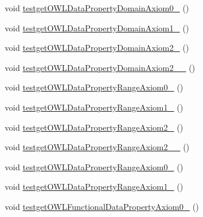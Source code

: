 \begin{DoxyCompactItemize}
\item 
void \hyperlink{classorg_1_1semanticweb_1_1owlapi_1_1api_1_1test_1_1_null_check_test_case_a35f9b613028e8d0bfddeb17ad31bd2d2}{testget\-O\-W\-L\-Data\-Property\-Domain\-Axiom0\-\_} ()
\item 
void \hyperlink{classorg_1_1semanticweb_1_1owlapi_1_1api_1_1test_1_1_null_check_test_case_ae4232028b1cac6cd1e59cfaa59e00edf}{testget\-O\-W\-L\-Data\-Property\-Domain\-Axiom1\-\_} ()
\item 
void \hyperlink{classorg_1_1semanticweb_1_1owlapi_1_1api_1_1test_1_1_null_check_test_case_aa768e12e483851c0548b05d6258f0262}{testget\-O\-W\-L\-Data\-Property\-Domain\-Axiom2\-\_} ()
\item 
void \hyperlink{classorg_1_1semanticweb_1_1owlapi_1_1api_1_1test_1_1_null_check_test_case_a3d2b5d087a7d6007fd44889649dc9647}{testget\-O\-W\-L\-Data\-Property\-Domain\-Axiom2\-\_\-\_} ()
\item 
void \hyperlink{classorg_1_1semanticweb_1_1owlapi_1_1api_1_1test_1_1_null_check_test_case_a3d0295a72e309258ad5590ffeb5872f0}{testget\-O\-W\-L\-Data\-Property\-Range\-Axiom0\-\_} ()
\item 
void \hyperlink{classorg_1_1semanticweb_1_1owlapi_1_1api_1_1test_1_1_null_check_test_case_a218759691599ef8ff486a4176f26eec4}{testget\-O\-W\-L\-Data\-Property\-Range\-Axiom1\-\_} ()
\item 
void \hyperlink{classorg_1_1semanticweb_1_1owlapi_1_1api_1_1test_1_1_null_check_test_case_a52a5991f75316ddeb27873025d0f3bf6}{testget\-O\-W\-L\-Data\-Property\-Range\-Axiom2\-\_} ()
\item 
void \hyperlink{classorg_1_1semanticweb_1_1owlapi_1_1api_1_1test_1_1_null_check_test_case_a65ff4352d263becf3473048848f5d43b}{testget\-O\-W\-L\-Data\-Property\-Range\-Axiom2\-\_\-\_} ()
\item 
void \hyperlink{classorg_1_1semanticweb_1_1owlapi_1_1api_1_1test_1_1_null_check_test_case_a2b4b97c47b650f3a342f45c47e4913b3}{testget\-O\-W\-L\-Data\-Property\-Range\-Axiom0\-\_} ()
\item 
void \hyperlink{classorg_1_1semanticweb_1_1owlapi_1_1api_1_1test_1_1_null_check_test_case_ad241f37825655aef67bb26edb9e66d99}{testget\-O\-W\-L\-Data\-Property\-Range\-Axiom1\-\_} ()
\item 
void \hyperlink{classorg_1_1semanticweb_1_1owlapi_1_1api_1_1test_1_1_null_check_test_case_a394e1220913f9e0db69ef3cfd6a355b7}{testget\-O\-W\-L\-Functional\-Data\-Property\-Axiom0\-\_} ()
\item 

\end{DoxyCompactItemize}
